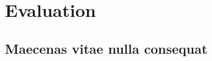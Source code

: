 \chapter{Evaluation}
\chaptoc
\label{chap:evaluation}
\bigskip

\section{Maecenas vitae nulla consequat} 
